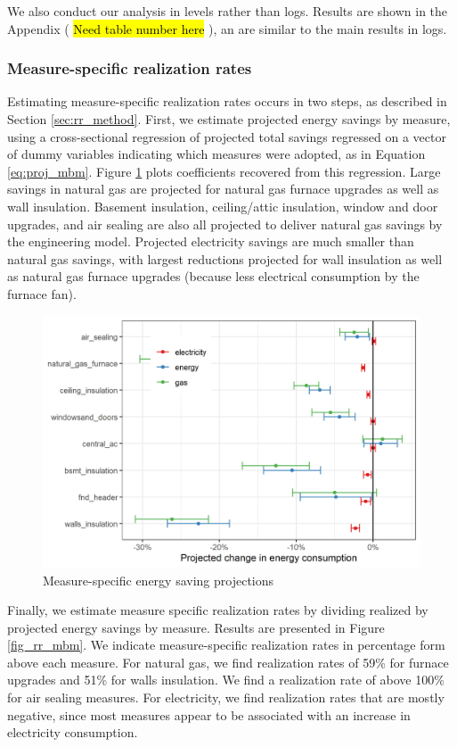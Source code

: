 \documentclass{article}
\newcommand{\hlc}[2][yellow]{ {\sethlcolor{#1} \hl{#2}} }
\begin{document}
We also conduct our analysis in levels rather than logs. Results are shown in the Appendix (\hlc{Need table number here}), an are similar to the main results in logs.



\subsubsection{Measure-specific realization rates}
Estimating measure-specific realization rates occurs in two steps, as described in Section \ref{sec:rr_method}. First, we estimate projected energy savings by measure, using a cross-sectional regression of projected total savings regressed on a vector of dummy variables indicating which measures were adopted, as in Equation \eqref{eq:proj_mbm}. Figure \ref{fig_mbm_proj} plots coefficients recovered from this regression. Large savings in natural gas are projected for natural gas furnace upgrades as well as wall insulation. Basement insulation, ceiling/attic insulation, window and door upgrades, and air sealing are also all projected to deliver natural gas savings by the engineering model. Projected electricity savings are much smaller than natural gas savings, with largest reductions projected for wall insulation as well as natural gas furnace upgrades (because less electrical consumption by the furnace fan).

\begin{figure}
	\includegraphics{../output_figures_tables/projected_es_mbm.png}
	\caption{Measure-specific energy saving projections}\label{fig_mbm_proj}
\end{figure}


Finally, we estimate measure specific realization rates by dividing realized by projected energy savings by measure.  Results are presented in Figure \ref{fig_rr_mbm}. We indicate measure-specific realization rates in percentage form above each measure. For natural gas, we find realization rates of 59\% for furnace upgrades and 51\% for walls insulation. We find a realization rate of above 100\% for air sealing measures. For electricity, we find realization rates that are mostly negative, since most measures appear to be associated with an increase in electricity consumption.
\end{document}
